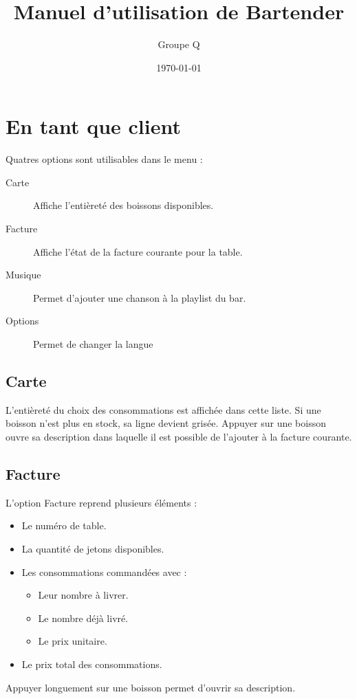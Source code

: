 \documentclass[a4paper,11pt]{article}
\title{Manuel d'utilisation de Bartender}
\date{\today}
\author{Groupe Q}
\begin{document}
{\let\newpage\relax\maketitle}

\section{En tant que client}

Quatres options sont utilisables dans le menu :

\begin{description}
	\item[Carte] Affiche l'entièreté des boissons disponibles.
	\item[Facture] Affiche l'état de la facture courante pour la table.
	\item[Musique] Permet d'ajouter une chanson à la playlist du bar.
	\item[Options] Permet de changer la langue
\end{description}

\subsection{Carte}	
L'entièreté du choix des consommations est affichée dans cette liste. Si une boisson n'est plus en stock, sa ligne devient grisée. Appuyer sur une boisson ouvre sa description dans laquelle il est possible de l'ajouter à la facture courante.

\subsection{Facture}
L'option Facture reprend plusieurs éléments :
\begin{itemize}
	\item Le numéro de table.
	\item La quantité de jetons disponibles.
	\item Les consommations commandées avec :
	\begin{itemize}
		\item Leur nombre à livrer.
		\item Le nombre déjà livré.
		\item Le prix unitaire.
	\end{itemize}
	\item Le prix total des consommations.
\end{itemize}

Appuyer longuement sur une boisson permet d'ouvrir sa description.
\end{document}
